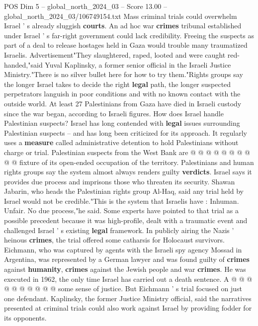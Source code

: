 \begin{textsample}{POS Dim 5 – global\_north\_2024\_03 – Score 13.00 – global\_north\_2024\_03/106749154.txt}  \label{ex:f5_pos_297}
Mass criminal trials could overwhelm Israel ' s already sluggish \textbf{courts}.
An ad hoc war \textbf{crimes} tribunal established under Israel ' s far-right government could lack credibility.
Freeing the suspects as part of a deal to release hostages held in Gaza would trouble many traumatized Israelis.
Advertisement"They slaughtered, raped, looted and were caught red-handed,"said Yuval Kaplinsky, a former senior official in the Israeli Justice Ministry."There is no silver bullet here for how to try them."Rights groups say the longer Israel takes to decide the right \textbf{legal} path, the longer suspected perpetrators languish in poor conditions and with no known contact with the outside world.
At least 27 Palestinians from Gaza have died in Israeli custody since the war began, according to Israeli figures.
How does Israel handle Palestinian suspects?
Israel has long contended with \textbf{legal} issues surrounding Palestinian suspects -- and has long been criticized for its approach.
It regularly uses a \textbf{measure} called administrative detention to hold Palestinians without charge or trial.
Palestinian suspects from the West Bank are @ @ @ @ @ @ @ @ @ @ fixture of its open-ended occupation of the territory.
Palestinians and human rights groups say the system almost always renders guilty \textbf{verdicts}.
Israel says it provides due process and imprisons those who threaten its security.
Shawan Jabarin, who heads the Palestinian rights group Al-Haq, said any trial held by Israel would not be credible."This is the system that Israelis have : Inhuman.
Unfair.
No due process,"he said.
Some experts have pointed to that trial as a possible precedent because it was high-profile, dealt with a traumatic event and challenged Israel ' s existing \textbf{legal} framework.
In publicly airing the Nazis ' heinous \textbf{crimes}, the trial offered some catharsis for Holocaust survivors.
Eichmann, who was captured by agents with the Israeli spy agency Mossad in Argentina, was represented by a German lawyer and was found guilty of \textbf{crimes} against \textbf{humanity}, \textbf{crimes} against the Jewish people and war \textbf{crimes}.
He was executed in 1962, the only time Israel has carried out a death sentence.
A @ @ @ @ @ @ @ @ @ @ some sense of justice.
But Eichmann ' s trial focused on just one defendant.
Kaplinsky, the former Justice Ministry official, said the narratives presented at criminal trials could also work against Israel by providing fodder for its opponents.

\end{textsample}
